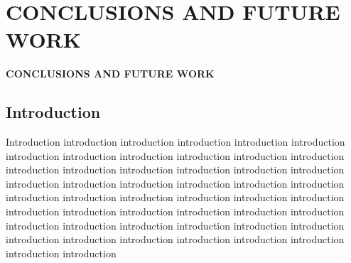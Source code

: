 \chapter{CONCLUSIONS AND FUTURE WORK}
\pagebreak

\begin{center}
{\LARGE\textbf{CONCLUSIONS AND FUTURE WORK}}
\end{center}


\section{Introduction}
Introduction introduction introduction introduction introduction introduction introduction introduction introduction introduction introduction introduction introduction introduction introduction introduction introduction introduction introduction introduction introduction introduction introduction introduction introduction introduction introduction introduction introduction introduction introduction introduction introduction introduction introduction introduction introduction introduction introduction introduction introduction introduction introduction introduction introduction introduction introduction introduction introduction introduction 